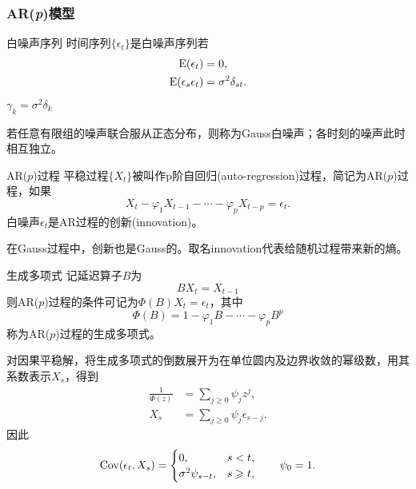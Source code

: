 \subsubsection{AR(\textit{p})模型}
\begin{definition}{白噪声序列}{}
	时间序列$\{\epsilon_t\}$是白噪声序列若
	\begin{equation}\label{eq:ps-white-noise}
	    \begin{aligned}
			\operatorname{E}(\epsilon_t) &= 0,\\
			\operatorname{E}(\epsilon_s\epsilon_t) &= \sigma^2\delta_{st}.
	    \end{aligned}
	\end{equation}
	$\gamma_k = \sigma^2\delta_k$
\end{definition}
若任意有限组的噪声联合服从正态分布，则称为Gauss白噪声；各时刻的噪声此时相互独立。
\begin{definition}{AR($p$)过程}{}
	平稳过程$\{X_t\}$被叫作p阶自回归(auto-regression)过程，简记为AR($p$)过程，如果
	\begin{equation}
		X_t - \varphi_1X_{t-1} - \cdots - \varphi_pX_{t-p} = \epsilon_t.
	\end{equation}
	白噪声$\epsilon_t$是AR过程的创新(innovation)。
\end{definition}
在Gauss过程中，创新也是Gauss的。取名innovation代表给随机过程带来新的熵。
\begin{definition}{生成多项式}{}
	记延迟算子$ B $为
	\begin{equation}\label{eq:ps-backshift}
		BX_t = X_{t-1}
	\end{equation}
	则AR($p$)过程的条件可记为$\Phi(B)X_t = \epsilon_t$，其中
	\begin{equation}
		\Phi(B) = 1 - \varphi_1B - \cdots - \varphi_pB^p
	\end{equation}
	称为AR($p$)过程的生成多项式。
\end{definition}
对因果平稳解，将生成多项式的倒数展开为在单位圆内及边界收敛的幂级数，用其系数表示$X_s$，得到
\begin{equation}\label{eq:ps-causal-ar-representation}
    \begin{aligned}
		\frac{1}{\Phi(z)} &= \sum_{j\geq0}\psi_j z^j,\\
		X_s &= \sum_{j\geq0}\psi_j\epsilon_{s-j}.
    \end{aligned}
\end{equation}
因此
\[
	\operatorname{Cov}(\epsilon_t,X_s) =
	\begin{cases}
		0,&s < t,\\
		\sigma^2\psi_{s-t},&s \geqslant t,
	\end{cases}
	\qquad\psi_0 = 1 .
\]

